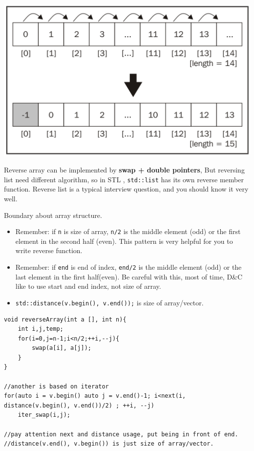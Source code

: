 \documentclass[a4paper,11pt,twoside]{book}
\begin{document}
\begin{center}
	\includegraphics[scale=0.35]{pics/array_insert.png} 
\end{center}


	
	\par  Reverse array can be implemented by \textbf{swap + double pointers}, But reversing list need different algorithm, so in STL , \texttt{std::list} has its own reverse member function. Reverse list is a typical interview question, and you should know it very well. 
	
	\par Boundary about array structure. 
	\begin{itemize}
		\item Remember: if \texttt{n} is size of array, \texttt{n/2} is the middle element (odd) or the first element in the second half (even). This pattern is very helpful for you to write reverse function. 
		
		\item Remember: if \texttt{end} is end of index, \texttt{end/2} is the middle element (odd) or the last element in the first half(even). Be careful with this, most of time, D\&C like to use start and end index, not size of array. 
		
		\item \texttt{std::distance(v.begin(), v.end());} is size of array/vector. 
	\end{itemize}
	
\begin{lstlisting}[breaklines]
void reverseArray(int a [], int n){
	int i,j,temp;
	for(i=0,j=n-1;i<n/2;++i,--j){
		swap(a[i], a[j]);
	}
}

//another is based on iterator
for(auto i = v.begin() auto j = v.end()-1; i<next(i, distance(v.begin(), v.end())/2) ; ++i, --j)
	iter_swap(i,j);

//pay attention next and distance usage, put being in front of end.
//distance(v.end(), v.begin()) is just size of array/vector. 
\end{lstlisting}
\end{document}
